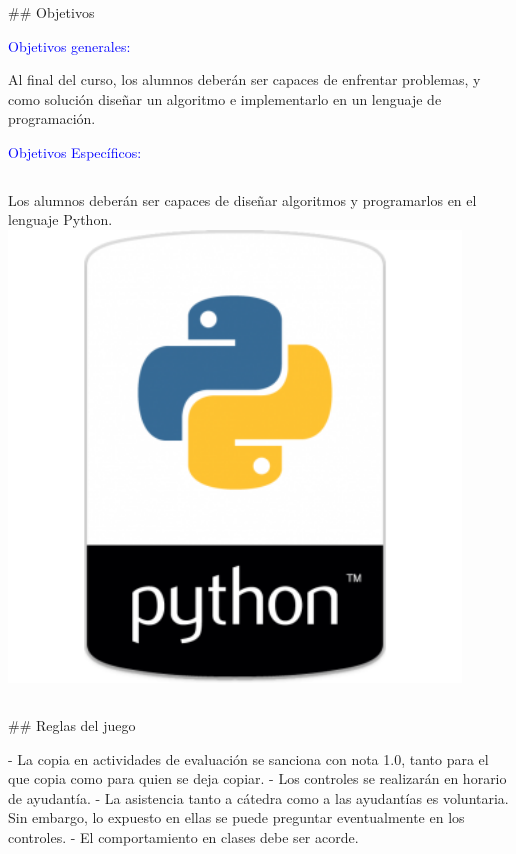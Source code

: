 ## Objetivos

\textcolor{blue}{Objetivos generales:}\newline

Al final del curso, los alumnos deberán ser capaces de enfrentar problemas, y como solución diseñar un algoritmo e
implementarlo en un lenguaje de programación.

\vfill
\pause

\vspace{1em}

\textcolor{blue}{Objetivos Específicos:}\newline

\begin{columns}[onlytextwidth,t]
Los alumnos deberán ser capaces de diseñar algoritmos y programarlos en el lenguaje Python.
\includegraphics[width=0.9\textwidth,valign=t]{img/xpython_sh-340x340.png}
\end{columns}

\vfill


## Reglas del juego

- La copia en actividades de evaluación se sanciona con nota 1.0, tanto para el que copia como para quien se deja copiar.
- Los controles se realizarán en horario de ayudantía.
- La asistencia tanto a cátedra como a las ayudantías es voluntaria. Sin embargo, lo
expuesto en ellas se puede preguntar
eventualmente en los controles.
- El comportamiento en clases debe ser acorde.


